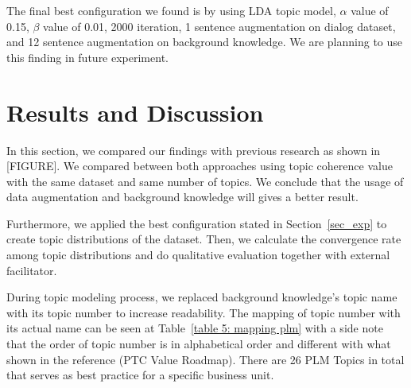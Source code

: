 \documentclass[10pt, conference, compsocconf]{IEEEtran}
\begin{document}
The final best configuration we found is by using LDA topic model, $\alpha$ value of 0.15, $\beta$ value of 0.01, 2000 iteration, 1 sentence augmentation on dialog dataset, and 12 sentence augmentation on background knowledge. We are planning to use this finding in future experiment.

\section{Results and Discussion}
In this section, we compared our findings with previous research\cite{b4} as shown in [FIGURE]. We compared between both approaches using topic coherence value with the same dataset and same number of topics. We conclude that the usage of data augmentation and background knowledge will gives a better result.



Furthermore, we applied the best configuration stated in Section~\ref{sec_exp} to create topic distributions of the dataset. Then, we calculate the convergence rate among topic distributions and do qualitative evaluation together with external facilitator. 

During topic modeling process, we replaced background knowledge's topic name with its topic number to increase readability. The mapping of topic number with its actual name can be seen at Table~\ref{table 5: mapping plm} with a side note that the order of topic number is in alphabetical order and different with what shown in the reference (PTC Value Roadmap). There are 26 PLM Topics in total that serves as best practice for a specific business unit.
\end{document}
